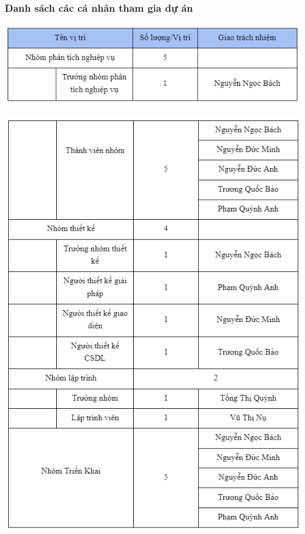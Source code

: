\documentclass[12pt]{article}
\begin{document}
\subsubsection{Danh sách các cá nhân tham gia dự án}
\includegraphics[width=15cm]{II_6_3_1.png}
\par
\hspace{-0.6cm}\includegraphics[width=15cm]{II_6_3_2.png}
\vspace{0.5cm}
\end{document}
